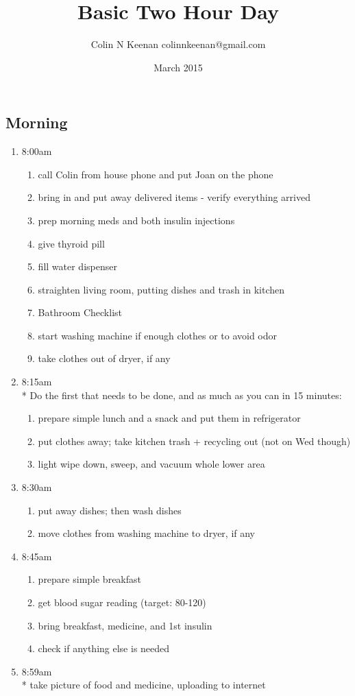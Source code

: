 \documentclass[12pt,letterpaper]{article}
\newcommand{\mytitle}{Basic Two Hour Day}
\begin{document}
\title{\mytitle{}}
\author{Colin N Keenan colinnkeenan@gmail.com}
\date{March 2015}
\begin{multicols}{2} 
\subsection*{Morning}
\begin{enumerate}
	\item 8:00am
		\begin{enumerate}
			\item call Colin from house phone and put Joan on the phone
			\item bring in and put away delivered items - verify everything arrived
			\item prep morning meds and both insulin injections
			\item give thyroid pill
			\item fill water dispenser
			\item straighten living room, putting dishes and trash in kitchen
			\item Bathroom Checklist
			\item start washing machine if enough clothes or to avoid odor
			\item take clothes out of dryer, if any
		\end{enumerate}
	\item 8:15am \\*
		Do the first that needs to be done, and as much as you can in 15 minutes:
		\begin{enumerate}
			\item prepare simple lunch and a snack and put them in refrigerator
			\item put clothes away; take kitchen trash + recycling out (not on Wed though)
			\item light wipe down, sweep, and vacuum whole lower area
		\end{enumerate}
	\item 8:30am
		\begin{enumerate}
			\item put away dishes; then wash dishes
			\item move clothes from washing machine to dryer, if any
		\end{enumerate}
	\item 8:45am
		\begin{enumerate}
			\item prepare simple breakfast
			\item get blood sugar reading (target: 80-120)
			\item bring breakfast, medicine, and 1st insulin
			\item check if anything else is needed
		\end{enumerate}
	\item 8:59am \\*
		take picture of food and medicine, uploading to internet
\end{enumerate}
\vfill
\columnbreak


\end{multicols}
\end{document}
